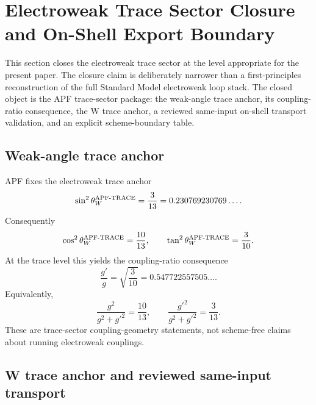 \section{Electroweak Trace Sector Closure and On-Shell Export Boundary}
\label{sec:ew-sector-closure-v22}

This section closes the electroweak trace sector at the level appropriate for the present paper.  The closure claim is deliberately narrower than a first-principles reconstruction of the full Standard Model electroweak loop stack.  The closed object is the APF trace-sector package: the weak-angle trace anchor, its coupling-ratio consequence, the W trace anchor, a reviewed same-input on-shell transport validation, and an explicit scheme-boundary table.

\subsection{Weak-angle trace anchor}

APF fixes the electroweak trace anchor
\begin{equation}
  \sin^2\theta_W^{\rm APF\text{-}TRACE}=\frac{3}{13}=0.230769230769\ldots .
\end{equation}
Consequently
\begin{equation}
  \cos^2\theta_W^{\rm APF\text{-}TRACE}=\frac{10}{13},
  \qquad
  \tan^2\theta_W^{\rm APF\text{-}TRACE}=\frac{3}{10}.
\end{equation}
At the trace level this yields the coupling-ratio consequence
\begin{equation}
  \boxed{\frac{g'}{g}=\sqrt{\frac{3}{10}}=0.547722557505\ldots .}
\end{equation}
Equivalently,
\begin{equation}
  \frac{g^2}{g^2+g'^2}=\frac{10}{13},
  \qquad
  \frac{g'^2}{g^2+g'^2}=\frac{3}{13}.
\end{equation}
These are trace-sector coupling-geometry statements, not scheme-free claims about running electroweak couplings.

\subsection{W trace anchor and reviewed same-input transport}


